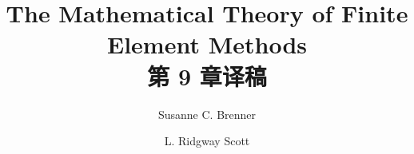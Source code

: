 \documentclass[a4paper,UTF8,12pt]{ctexart}
\title{The Mathematical Theory of Finite Element Methods\\第 9 章译稿}
\author{Susanne C. Brenner \and L. Ridgway Scott}
\date{}
\begin{document}
\maketitle
\setcounter{section}{8}
\renewcommand{\thethmcount}{\thesubsection.\arabic{thmcount}}
\renewcommand{\theequation}{\thesubsection.\arabic{equation}}
\renewcommand{\thefigure}{\thesection.\arabic{figure}}
\renewcommand{\thetable}{\thesection.\arabic{table}}

\end{document}

